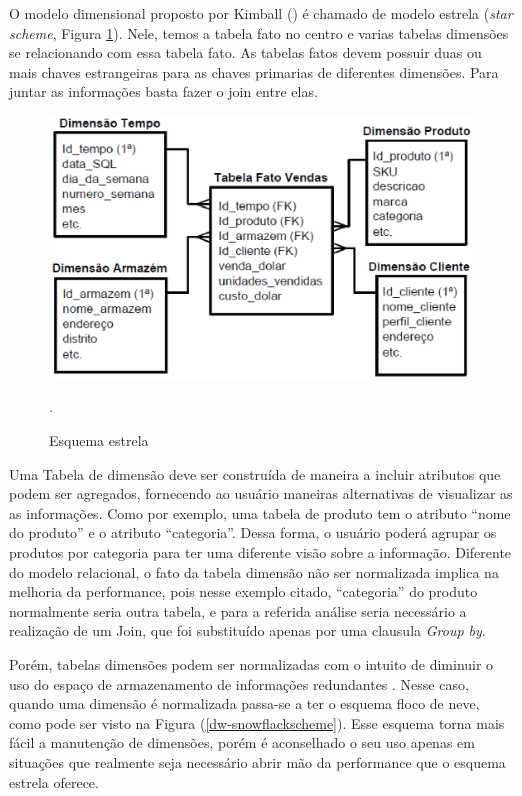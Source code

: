 %

O modelo dimensional proposto por Kimball (\citeyear{kimball2002}) é chamado de modelo estrela (\emph{star scheme}, Figura \ref{dw-starscheme}). Nele, temos a tabela fato no centro e varias tabelas dimensões se relacionando com essa tabela fato. As tabelas fatos devem possuir duas ou mais chaves estrangeiras para as chaves primarias de diferentes dimensões. Para juntar as informações basta fazer o join entre elas.

 \begin{figure}[!htb]
 	\centering
 		\includegraphics[scale=0.8]{figuras/dw-Modelo-estrela}
 		\caption{Esquema estrela}.
 		\label{dw-starscheme}
 \end{figure}

%

Uma Tabela de dimensão deve ser construída de maneira a incluir atributos que podem ser agregados, fornecendo ao usuário maneiras alternativas de visualizar as as informações. Como por exemplo, uma tabela de produto tem o atributo “nome do produto” e o atributo “categoria”. Dessa forma, o usuário poderá agrupar os produtos por categoria para ter uma diferente visão sobre a informação. Diferente do modelo relacional, o fato da tabela dimensão não ser normalizada implica na melhoria da performance, pois nesse exemplo citado, “categoria” do produto normalmente seria outra tabela, e para a referida análise seria necessário a realização de um Join, que foi substituído apenas por uma clausula \emph{Group by}.

%

Porém, tabelas dimensões podem ser normalizadas com o intuito de diminuir o uso do espaço de armazenamento de informações redundantes \cite{kimball2002}. Nesse caso, quando uma dimensão é normalizada passa-se a ter o esquema floco de neve, como pode ser visto na Figura (\ref{dw-snowflackscheme}). Esse esquema torna mais fácil a manutenção de dimensões, porém é aconselhado o seu uso apenas em situações que realmente seja necessário abrir mão da performance que o esquema estrela oferece.

